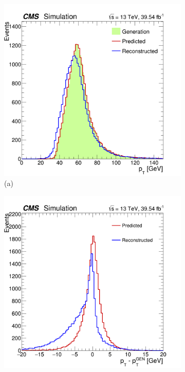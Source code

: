 \begin{myitemlist}
    \begin{figure}[!ht]
        \captionsetup[subfigure]{labelformat=empty}
        \vspace*{-0.2cm}
        \centering
        \setlength{\mylength}{\textwidth}
        \begin{subfigure}[t]{0.50\mylength}
            \centering
            \includegraphics[width=0.45\mylength]{resources/plots/Phi3_model_pt.png}
            \caption{\footnotesize (a)}
        \end{subfigure}%
        \begin{subfigure}[t]{0.50\mylength}
            \centering
            \includegraphics[width=0.45\mylength]{resources/plots/Phi3_model_pt_residuals.png}

\end{subfigure}
\end{figure}
\end{myitemlist}
